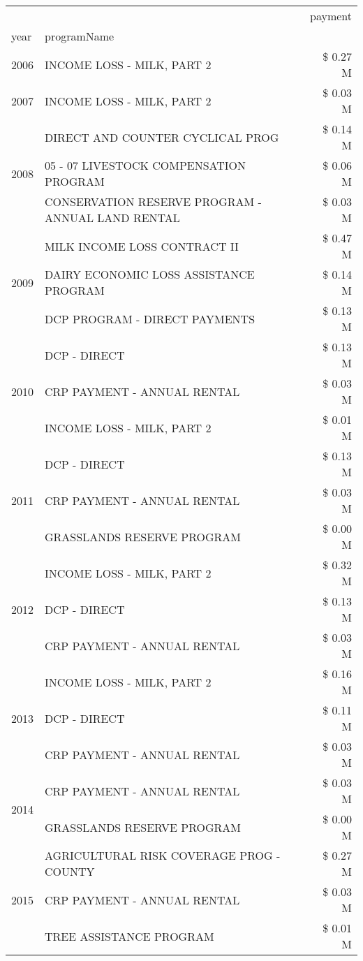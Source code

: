 \begin{tabular}{llr}
\toprule
 &  & payment \\
year & programName &  \\
\midrule
2006 & INCOME LOSS - MILK, PART 2 & \$ 0.27 M \\
\cline{1-3}
2007 & INCOME LOSS - MILK, PART 2 & \$ 0.03 M \\
\cline{1-3}
\multirow[t]{3}{*}{2008} & DIRECT AND COUNTER CYCLICAL PROG & \$ 0.14 M \\
 & 05 - 07 LIVESTOCK COMPENSATION PROGRAM & \$ 0.06 M \\
 & CONSERVATION RESERVE PROGRAM - ANNUAL LAND RENTAL & \$ 0.03 M \\
\cline{1-3}
\multirow[t]{3}{*}{2009} & MILK INCOME LOSS CONTRACT II & \$ 0.47 M \\
 & DAIRY ECONOMIC LOSS ASSISTANCE PROGRAM & \$ 0.14 M \\
 & DCP PROGRAM - DIRECT PAYMENTS & \$ 0.13 M \\
\cline{1-3}
\multirow[t]{3}{*}{2010} & DCP - DIRECT & \$ 0.13 M \\
 & CRP PAYMENT - ANNUAL RENTAL & \$ 0.03 M \\
 & INCOME LOSS - MILK, PART 2 & \$ 0.01 M \\
\cline{1-3}
\multirow[t]{3}{*}{2011} & DCP - DIRECT & \$ 0.13 M \\
 & CRP PAYMENT - ANNUAL RENTAL & \$ 0.03 M \\
 & GRASSLANDS RESERVE PROGRAM & \$ 0.00 M \\
\cline{1-3}
\multirow[t]{3}{*}{2012} & INCOME LOSS - MILK, PART 2 & \$ 0.32 M \\
 & DCP - DIRECT & \$ 0.13 M \\
 & CRP PAYMENT - ANNUAL RENTAL & \$ 0.03 M \\
\cline{1-3}
\multirow[t]{3}{*}{2013} & INCOME LOSS - MILK, PART 2 & \$ 0.16 M \\
 & DCP - DIRECT & \$ 0.11 M \\
 & CRP PAYMENT - ANNUAL RENTAL & \$ 0.03 M \\
\cline{1-3}
\multirow[t]{2}{*}{2014} & CRP PAYMENT - ANNUAL RENTAL & \$ 0.03 M \\
 & GRASSLANDS RESERVE PROGRAM & \$ 0.00 M \\
\cline{1-3}
\multirow[t]{3}{*}{2015} & AGRICULTURAL RISK COVERAGE PROG - COUNTY & \$ 0.27 M \\
 & CRP PAYMENT - ANNUAL RENTAL & \$ 0.03 M \\
 & TREE ASSISTANCE PROGRAM & \$ 0.01 M \\

\end{tabular}
